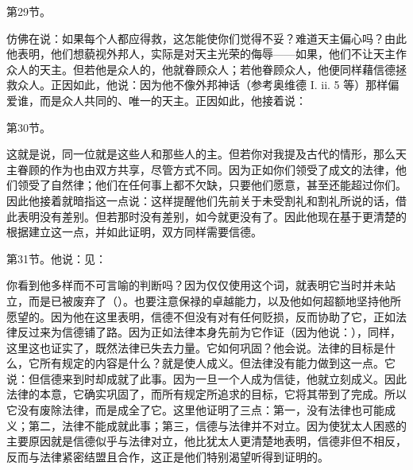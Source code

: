 第29节。\par

仿佛在说：如果每个人都应得救，这怎能使你们觉得不妥？难道天主偏心吗？由此他表明，他们想藐视外邦人，实际是对天主光荣的侮辱——如果，他们不让天主作众人的天主。但若他是众人的，他就眷顾众人；若他眷顾众人，他便同样藉信德拯救众人。正因如此，他说：因为他不像外邦神话（参考奥维德 I. ii. 5 等）那样偏爱谁，而是众人共同的、唯一的天主。正因如此，他接着说：\par

第30节。\par

这就是说，同一位就是这些人和那些人的主。但若你对我提及古代的情形，那么天主眷顾的作为也由双方共享，尽管方式不同。因为正如你们领受了成文的法律，他们领受了自然律；他们在任何事上都不欠缺，只要他们愿意，甚至还能超过你们。因此他接着就暗指这一点说：这样提醒他们先前关于未受割礼和割礼所说的话，借此表明没有差别。但若那时没有差别，如今就更没有了。因此他现在基于更清楚的根据建立这一点，并如此证明，双方同样需要信德。\par

第31节。他说：见：\par

你看到他多样而不可言喻的判断吗？因为仅仅使用这个词，就表明它当时并未站立，而是已被废弃了（）。也要注意保禄的卓越能力，以及他如何超额地坚持他所愿望的。因为他在这里表明，信德不但没有对有任何贬损，反而协助了它，正如法律反过来为信德铺了路。因为正如法律本身先前为它作证（因为他说：），同样，这里这也证实了，既然法律已失去力量。它如何巩固？他会说。法律的目标是什么，它所有规定的内容是什么？就是使人成义。但法律没有能力做到这一点。它说：但信德来到时却成就了此事。因为一旦一个人成为信徒，他就立刻成义。因此法律的本意，它确实巩固了，而所有规定所追求的目标，它将其带到了完成。所以它没有废除法律，而是成全了它。这里他证明了三点：第一，没有法律也可能成义；第二，法律不能成就此事；第三，信德与法律并不对立。因为使犹太人困惑的主要原因就是信德似乎与法律对立，他比犹太人更清楚地表明，信德非但不相反，反而与法律紧密结盟且合作，这正是他们特别渴望听得到证明的。\par

